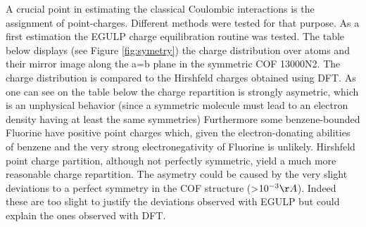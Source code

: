 A crucial point in estimating the classical Coulombic interactions is the assignment of point-charges. Different methods were tested for that purpose. As a first estimation the EGULP charge equilibration routine was tested. The table below displays (see Figure \ref{fig:symetry}) the charge distribution over atoms and their mirror image along the a=b plane in the symmetric COF 13000N2. The charge distribution is compared to the Hirshfeld charges obtained using DFT. As one can see on the table below the charge repartition is strongly asymetric, which is an unphysical behavior (since a symmetric molecule must lead to an electron density having at least the same symmetries)
Furthermore some benzene-bounded Fluorine have positive point charges which, given the electron-donating abilities of benzene and the very strong electronegativity of Fluorine is unlikely. Hirshfeld point charge partition, although not perfectly symmetric, yield a much more reasonable charge repartition.
The asymetry could be caused by the very slight deviations to a perfect symmetry in the COF structure (>$10^{-3}\AA$). Indeed these are too slight to justify the  deviations observed with EGULP but could explain the ones observed with DFT.

